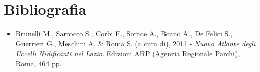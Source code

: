 \section*{Bibliografia}
\begin{itemize}\itemsep0pt
	\item Brunelli M., Sarrocco S., Corbi F., Sorace A., Boano
A\textcolor{red}{.}, De Felici S., Guerrieri G., Meschini A. \& Roma S.
(a cura di), 2011 - \textit{Nuovo Atlante degli Uccelli Nidificanti nel
Lazio}. Edizioni ARP (Agenzia Regionale Parchi), Roma, 464 pp.
\end{itemize}

